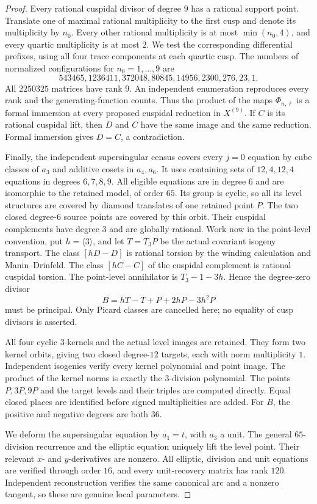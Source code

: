 \begin{proof}
Every rational cuspidal divisor of degree $9$ has a rational support point.
Translate one of maximal rational multiplicity to the first cusp and denote its multiplicity by $n_0$.
Every other rational multiplicity is at most $\min(n_0,4)$, and every quartic multiplicity is at most $2$.
We test the corresponding differential prefixes, using all four trace components at each quartic cusp.
The numbers of normalized configurations for $n_0=1,\ldots,9$ are
\[
 543465,1236411,372048,80845,14956,2300,276,23,1.
\]
All $2250325$ matrices have rank $9$.
An independent enumeration reproduces every rank and the generating-function counts.
Thus the product of the maps $\Phi_{n,\ell}$ is a formal immersion at every proposed cuspidal reduction in $X^{(9)}$.
If $C$ is its rational cuspidal lift, then $D$ and $C$ have the same image and the same reduction.
Formal immersion gives $D=C$, a contradiction.

Finally, the independent supersingular census covers every $j=0$ equation by cube classes of $a_3$ and additive cosets in $a_4,a_6$.
It uses containing sets of $12,4,12,4$ equations in degrees $6,7,8,9$.
All eligible equations are in degree $6$ and are isomorphic to the retained model, of order $65$.
Its group is cyclic, so all its level structures are covered by diamond translates of one retained point $P$.
The two closed degree-$6$ source points are covered by this orbit.
Their cuspidal complements have degree $3$ and are globally rational.
Work now in the point-level convention, put $h=\langle3\rangle$, and let $T=T_3P$ be the actual covariant isogeny transport.
The class $[hD-D]$ is rational torsion by the winding calculation and Manin--Drinfeld.
The class $[hC-C]$ of the cuspidal complement is rational cuspidal torsion.
The point-level annihilator is $T_3-1-3h$.
Hence the degree-zero divisor
\[
 B=hT-T+P+2hP-3h^2P
\]
must be principal.
Only Picard classes are cancelled here; no equality of cusp divisors is asserted.

All four cyclic $3$-kernels and the actual level images are retained.
They form two kernel orbits, giving two closed degree-$12$ targets, each with norm multiplicity $1$.
Independent isogenies verify every kernel polynomial and point image.
The product of the kernel norms is exactly the $3$-division polynomial.
The points $P,3P,9P$ and the target levels and their triples are computed directly.
Equal closed places are identified before signed multiplicities are added.
For $B$, the positive and negative degrees are both $36$.

We deform the supersingular equation by $a_1=t$, with $a_3$ a unit.
The general $65$-division recurrence and the elliptic equation uniquely lift the level point.
Their relevant $x$- and $y$-derivatives are nonzero.
All elliptic, division and unit equations are verified through order $16$, and every unit-recovery matrix has rank $120$.
Independent reconstruction verifies the same canonical arc and a nonzero tangent, so these are genuine local parameters.


\end{proof}
